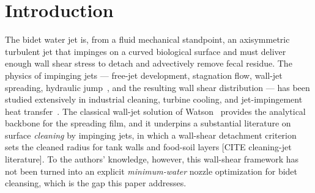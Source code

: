 \documentclass[aps,prfluids,reprint,amsmath,amssymb,floatfix]{revtex4-2}
\begin{document}
\maketitle

\section{Introduction}
\label{sec:intro}

The bidet water jet is, from a fluid mechanical standpoint, an axisymmetric
turbulent jet that impinges on a curved biological surface and must
deliver enough wall shear stress to detach and advectively remove fecal
residue. The physics of impinging jets --- free-jet development, stagnation
flow, wall-jet spreading, hydraulic jump~\citep{BohrEtAl1993,BushAristoff2003},
and the resulting wall shear
distribution --- has been studied extensively in industrial cleaning,
turbine cooling, and jet-impingement heat transfer~\citep{ZuckermanLior2006}.
The classical wall-jet solution of Watson~\citep{Watson1964} provides the
analytical backbone for the spreading film, and it underpins a substantial
literature on surface \emph{cleaning} by impinging jets, in which a wall-shear
detachment criterion sets the cleaned radius for tank walls and food-soil layers
[CITE cleaning-jet literature]. To the authors' knowledge, however, this
wall-shear framework has not been turned into an explicit \emph{minimum-water}
nozzle optimization for bidet cleansing, which is the gap this paper addresses.
\end{document}
